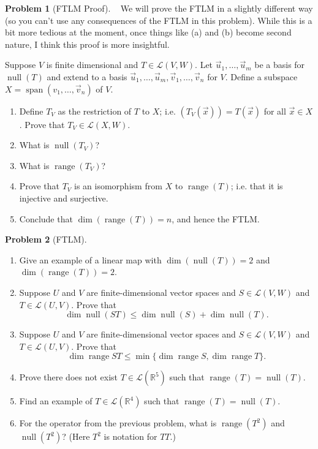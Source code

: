 \documentclass[12pt]{article}
\theoremstyle{definition}
\newtheorem{problem}{Problem}
\newcommand{\range}{\operatorname{range}}
\renewcommand{\null}{\operatorname{null}}
\begin{document}
\begin{problem}[FTLM Proof]~
We will prove the FTLM in a slightly different way (so you can't use any consequences of the FTLM in this problem). 
While this is a bit more tedious at the moment, once things like (a) and (b) become second nature, I think this proof is more insightful.

Suppose $V$ is finite dimensional and $T\in\mathcal{L}(V,W)$.
Let $\vec{u}_1, \ldots, \vec{u}_m$ be a basis for $\null(T)$ and extend to a basis  $\vec{u}_1, \ldots, \vec{u}_m, \vec{v}_1, \ldots, \vec{v}_n$ for $V$.
Define a subspace  $X=\operatorname{span}({v}_1, \ldots, \vec{v}_n)$ of $V$.
\begin{enumerate}
    \item Define $T_V$ as the restriction of $T$ to $X$; i.e. $(T_V(\vec{x})) = T(\vec{x})$ for all $\vec{x}\in X$. Prove that $T_V\in\mathcal{L}(X,W)$.
    \item What is $\null(T_V)$?
    \item What is $\range(T_V)$?
    \item Prove that $T_V$ is an isomorphism from $X$ to $\range(T)$; i.e. that it is injective and surjective.
    \item Conclude that $\dim(\range(T)) = n$, and hence the FTLM.
\end{enumerate}
\end{problem}

\begin{problem}[FTLM]~
\begin{enumerate}
    \item Give an example of a linear map with $\dim(\null(T)) = 2$ and $\dim(\range(T)) = 2$.
    \item Suppose $U$ and $V$ are finite-dimensional vector spaces and $S \in \mathcal{L}(V, W)$ and $T \in \mathcal{L}(U, V)$. Prove that
    \[
    \dim \null (S T) \leq \dim \null (S)+\dim \null(T) .
    \]
    \item Suppose $U$ and $V$ are finite-dimensional vector spaces and $S \in \mathcal{L}(V, W)$ and $T \in \mathcal{L}(U, V)$. Prove that
    \[
        \dim \range S T \leq \min \{\dim \range S, \dim \range T\}.\]
    \item Prove there does not exist $T\in\mathcal{L}(\mathbb{R}^5)$ such that $\range(T) = \null(T)$.
    \item Find an example of $T\in\mathcal{L}(\mathbb{R}^4)$ such that $\range(T) = \null(T)$.
    \item For the operator from the previous problem, what is $\range(T^2)$ and $\null(T^2)$? (Here $T^2$ is notation for $TT$.)
\end{enumerate}
\end{problem}
\end{document}
